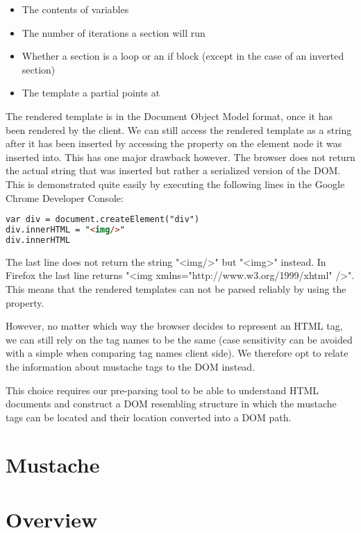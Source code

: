 \begin{itemize}
\item The contents of variables
\item The number of iterations a section will run
\item Whether a section is a loop or an if block
        (except in the case of an inverted section)
\item The template a partial points at
\end{itemize}

The rendered template is in the Document Object Model format, once it has
been rendered by the client. We can still access the rendered template as a
string after it has been inserted by accessing the  property
on the element node it was inserted into. This has one major drawback however.
The browser does not return the actual string that was inserted but rather a
serialized version of the DOM. This is demonstrated quite easily by executing
the following lines in the Google Chrome Developer Console:
\begin{lstlisting}[language=HTML]
var div = document.createElement("div")
div.innerHTML = "<img/>"
div.innerHTML
\end{lstlisting}

The last line does not return the string "<img/>" but "<img>" instead.
In Firefox the last line returns "<img xmlns="http://www.w3.org/1999/xhtml" />".
This means that the rendered templates can not be parsed reliably by using the
 property.

However, no matter which way the browser decides to represent an HTML tag,
we can still rely on the tag names to be the same
(case sensitivity can be avoided with a simple
 when comparing tag names client side).
We therefore opt to relate the information about mustache tags to the DOM instead.

This choice requires our pre-parsing tool to be able to understand
HTML documents and construct a DOM resembling structure in which the
mustache tags can be located and their location converted into a DOM path.

\section{Mustache}

\section{Overview}
